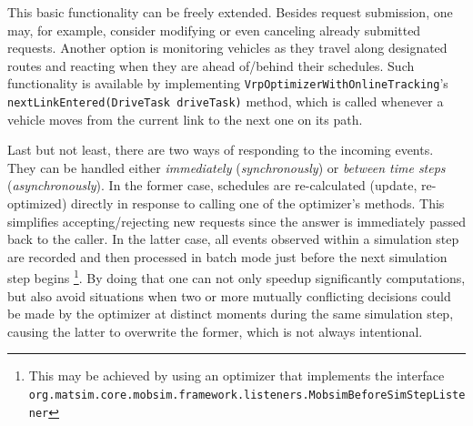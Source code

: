 This basic functionality can be freely extended. Besides request submission, one may, for example, consider modifying or even canceling already submitted requests. Another option is monitoring vehicles as they travel along designated routes and reacting when they are ahead of/behind their schedules. Such functionality is available by implementing \lstinline$VrpOptimizerWithOnlineTracking$'s \lstinline$nextLinkEntered(DriveTask driveTask)$ method, which is called whenever a vehicle moves from the current link to the next one on its path.

Last but not least, there are two ways of responding to the incoming events. They can be handled either \emph{immediately} (\emph{synchronously}) or \emph{between time steps} (\emph{asynchronously}). In the former case, schedules are re-calculated (update, re-optimized) directly in response to calling one of the optimizer's methods. This simplifies accepting/rejecting new requests since the answer is immediately passed back to the caller. In the latter case, all events observed within a simulation step are recorded and then processed in batch mode just before the next simulation step begins%
\footnote{
This may be achieved by using an optimizer that implements the interface \lstinline$org.matsim.core.mobsim.framework.listeners.MobsimBeforeSimStepListener$ 
}.
By doing that one can not only speedup significantly computations, but also avoid situations when %
two or more mutually conflicting decisions could be made by the optimizer at distinct moments during the same simulation step, causing the latter to overwrite the former, which is not always intentional.

